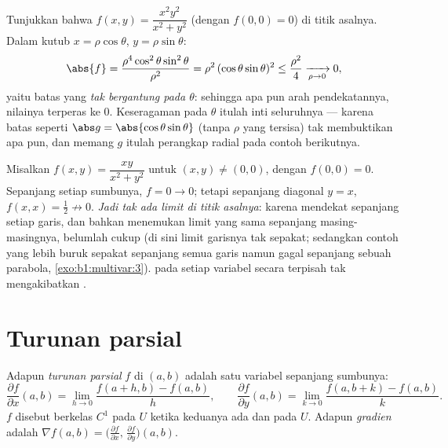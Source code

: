 \begin{example}
\label{ex:b1:multivar:polarbound}
Tunjukkan bahwa $f(x, y) = \dfrac{x^2y^2}{x^2 + y^2}$ (dengan $f(0,0) =
0$)  di titik asalnya. Dalam  kutub $x =
\rho\cos\theta$, $y = \rho\sin\theta$:
\[
\abs{f} = \frac{\rho^4\cos^2\theta\sin^2\theta}{\rho^2}
= \rho^2\,(\cos\theta\sin\theta)^2 \leq \frac{\rho^2}{4}
\xrightarrow[\rho \to 0]{} 0 ,
\]
yaitu batas yang \emph{tak bergantung pada $\theta$}: sehingga apa pun arah
pendekatannya, nilainya terperas ke $0$. Keseragaman pada
$\theta$ itulah inti seluruhnya --- karena batas seperti $\abs g =
\abs{\cos\theta\sin\theta}$ (tanpa $\rho$ yang tersisa) tak membuktikan apa pun,
dan memang $g$ itulah perangkap radial pada
contoh berikutnya.
\end{example}

\begin{example}\label{ex:b1:multivar:trap}
Misalkan $f(x, y) = \dfrac{xy}{x^2 + y^2}$ untuk $(x,y) \neq (0,0)$, dengan $f(0,
0) = 0$. Sepanjang setiap sumbunya, $f = 0 \to 0$; tetapi sepanjang diagonal $y
= x$, $f(x, x) = \frac12 \not\to 0$. \emph{Jadi tak ada limit di titik asalnya}:
karena mendekat sepanjang setiap garis, dan bahkan menemukan limit yang sama sepanjang
masing-masingnya, belumlah cukup (di sini limit garisnya tak sepakat; sedangkan contoh yang lebih buruk
sepakat sepanjang semua garis namun gagal sepanjang sebuah parabola,
\cref{exo:b1:multivar:3}).  pada setiap variabel secara terpisah
tak mengakibatkan .
\end{example}

\section{Turunan parsial}

\begin{definition}\label{def:b1:multivar:partial}
Adapun \emph{turunan parsial} $f$ di
$(a, b)$ adalah  satu variabel sepanjang sumbunya:
\[
\frac{\partial f}{\partial x}(a,b)
= \lim_{h \to 0} \frac{f(a + h, b) - f(a,b)}{h},
\qquad
\frac{\partial f}{\partial y}(a,b)
= \lim_{k \to 0} \frac{f(a, b + k) - f(a,b)}{k}.
\]
$f$ disebut berkelas $C^1$ pada $U$ ketika keduanya ada dan  pada
$U$. Adapun \emph{gradien} adalah $\nabla f(a,b) =
\bigl(\frac{\partial f}{\partial x},\, \frac{\partial f}{\partial
y}\bigr)(a,b)$.
\end{definition}

